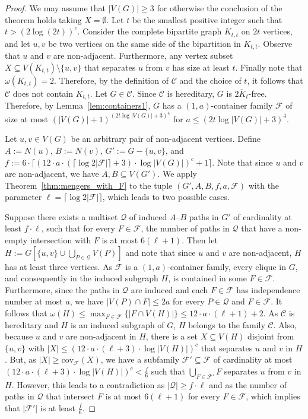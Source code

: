 \documentclass[11pt]{amsart}
\begin{document}
\begin{proof}
    We may assume that $|V(G)| \geq 3$ for otherwise the conclusion of the theorem holds taking $X=\emptyset$.
    Let $t$ be the smallest positive integer such that $t > (2 \log(2t))^c$. Consider the complete bipartite graph $K_{t,t}$ on $2t$ vertices, and let $u, v$ be two vertices on the same side of the bipartition in $K_{t,t}$. Observe that $u$ and $v$ are non-adjacent. Furthermore, any vertex subset $X \subseteq V(K_{t,t}) \setminus \{u, v\}$ that separates $u$ from $v$ has size at least $t$. Finally note that $\omega(K_{t,t}) = 2$.  Therefore, by the definition of $\mathcal{C}$ and the choice of $t$, it follows that $\mathcal{C}$ does not contain $K_{t,t}$. Let $G \in \mathcal{C}$. Since $\mathcal{C}$ is hereditary, $G$ is $\overline{2K_t}$-free. Therefore, by Lemma~\ref{lem:containers1}, $G$ has a $(1,a)$-container family $\mathcal{F}$ of size at most ${(|V(G)|+1)}^{(2t \log |V(G)| + 3)^4}$ for $a \leq (2t \log |V(G)| + 3)^4$.

    Let $u,v\in V(G)$ be an arbitrary pair of non-adjacent vertices. Define $A := N(u)$, $B := N(v)$, $G' := G - \{u, v\}$, and $f := 6 \cdot \lceil (12 \cdot a \cdot {(\lceil \log 2|\mathcal{F}| \rceil + 3)} \cdot \log|V(G)|)^c + 1 \rceil$. Note that since $u$ and $v$ are non-adjacent, we have $A, B \subseteq V(G')$. We apply Theorem~\ref{thm:mengers_with_F} to the tuple $(G', A, B, f, a, \mathcal{F})$ with the parameter $\ell = \lceil \log 2|\mathcal{F}| \rceil$, which leads to two possible cases.

    Suppose there exists a multiset $\mathcal{Q}$ of induced $A$--$B$ paths in $G'$ of cardinality at least $f \cdot \ell$, such that for every $F \in \mathcal{F}$, the number of paths in $\mathcal{Q}$ that have a non-empty intersection with $F$ is at most ${ 6(\ell+1)}$. Then let $H := G[\{u,v\}\cup\bigcup_{P\in\mathcal{Q}}V(P)]$ and note that since $u$ and $v$ are non-adjacent, $H$ has at least three vertices. As $\mathcal{F}$ is a $(1,a)$-container family, every clique in $G$, and consequently in the induced subgraph $H$, is contained in some $F \in \mathcal{F}$. Furthermore, since the paths in $\mathcal{Q}$ are induced and each $F \in \mathcal{F}$ has independence number at most $a$, we have $|V(P) \cap F| \leq 2a$ for every $P \in \mathcal{Q}$ and $F \in \mathcal{F}$. It follows that $\omega(H) \leq \max_{F\in\mathcal{F}}\{|F\cap V(H)|\} \leq 12\cdot a\cdot { (\ell+1) + 2}$.
    As $\mathcal{C}$ is hereditary and $H$ is an induced subgraph of $G$, $H$ belongs to the family $\mathcal{C}$. Also, because $u$ and $v$ are non-adjacent in $H$, there is  a set $X \subseteq V(H)$ disjoint from $\{u,v\}$ with $|X| \leq (12 \cdot a \cdot { (\ell+3)} \cdot \log |V(H)|)^c$ that separates $u$ and $v$ in $H$. But, as $|X|\geq \mathrm{cov}_{\mathcal{F}}(X)$, we have a subfamily $\mathcal{F}'\subseteq\mathcal{F}$ of cardinality at most $(12 \cdot a \cdot { (\ell+3)} \cdot \log |V(H)|)^c < \frac{f}{6}$ such that $\bigcup_{F\in\mathcal{F}'}F$ separates $u$ from $v$ in $H$. However, this leads to a contradiction as $|\mathcal{Q}| \geq f\cdot\ell$ and as the number of paths in $\mathcal{Q}$ that intersect $F$ is at most $6  { (\ell+1)}$ for every $F \in \mathcal{F}$, which implies that $|\mathcal{F}'|$ is at least $\frac{f}{6}$.
    

\end{proof}
\end{document}
